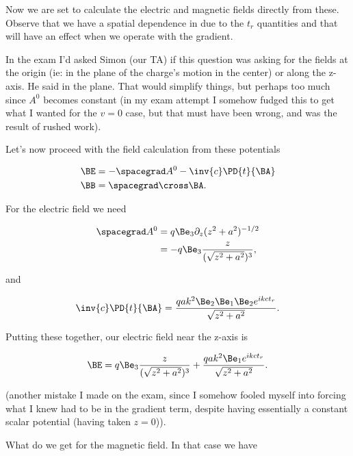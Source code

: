 Now we are set to calculate the electric and magnetic fields directly from these.  Observe that we have a spatial dependence in due to the $t_r$ quantities and that will have an effect when we operate with the gradient.  

In the exam I'd asked Simon (our TA) if this question was asking for the fields at the origin (ie: in the plane of the charge's motion in the center) or along the z-axis.  He said in the plane.  That would simplify things, but perhaps too much since $A^0$ becomes constant (in my exam attempt I somehow fudged this to get what I wanted for the $v = 0$ case, but that must have been wrong, and was the result of rushed work).

Let's now proceed with the field calculation from these potentials

\begin{align}\label{eqn:relativisticElectrodynamicsExamReflection:190}
\BE &= - \spacegrad A^0 - \inv{c} \PD{t}{\BA} \\
\BB &= \spacegrad \cross \BA.
\end{align}

For the electric field we need

\begin{align*}
\spacegrad A^0  
&= q \Be_3 \partial_z (z^2 + a^2)^{-1/2} \\
&= -q \Be_3 \frac{z}{(\sqrt{z^2 + a^2})^3},
\end{align*}

and

\begin{equation}\label{eqn:relativisticElectrodynamicsExamReflection:210}
\inv{c} \PD{t}{\BA} =
\frac{q a k^2 \Be_2 \Be_1 \Be_2 e^{i k c t_r} }{\sqrt{z^2 + a^2}}.
\end{equation}

Putting these together, our electric field near the z-axis is

\begin{equation}\label{eqn:relativisticElectrodynamicsExamReflection:230}
\BE = 
q \Be_3 \frac{z}{(\sqrt{z^2 + a^2})^3}
+
\frac{q a k^2 \Be_1 e^{i k c t_r} }{\sqrt{z^2 + a^2}}.
\end{equation}

(another mistake I made on the exam, since I somehow fooled myself into forcing what I knew had to be in the gradient term, despite having essentially a constant scalar potential (having taken $z = 0$)).

What do we get for the magnetic field.  In that case we have

